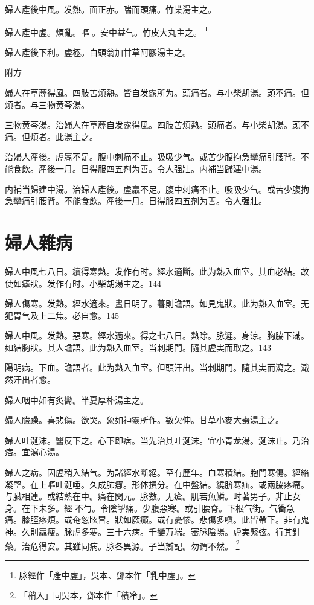 {\khaaitp 婦人}產後中風。发熱。面{\khaaitp 正}赤。喘而頭痛。竹枼湯主之。

婦人產中虗。煩亂。嘔{\sungtpii 𠱘}。安中益气。竹皮大丸主之。
	\footnote{脉經作「產中虗」，吳本、鄧本作「乳中虗」。}

{\khaaitp 婦人}產後下利。虗極。白頭翁加甘草阿膠湯主之。

附方

婦人在草蓐得風。四肢苦煩熱。皆自发露所为。頭痛者。与小柴胡湯。頭不痛。但煩者。与三物黄芩湯。{\wuben}

三物黄芩湯。治婦人在草蓐自发露得風。四肢苦煩熱。頭痛者。与小柴胡湯。頭不痛。但煩者。此湯主之。{\dengben}

治婦人產後。虗羸不足。腹中刺痛不止。吸吸少气。或苦少腹拘急攣痛引腰背。不能食飲。產後一月。日得服四五剂为善。令人强壯。内補当歸建中湯。{\wuben}

内補当歸建中湯。治婦人產後。虗羸不足。腹中刺痛不止。吸吸少气。或苦少腹拘急攣痛引腰背。不能食飲。產後一月。日得服四五剂为善。令人强壯。{\dengben}

\chapter{婦人雜病}

婦人中風七八日。續得寒熱。发作有时。經水適斷。此为熱入血室。其血必結。故使如瘧狀。发作有时。小柴胡湯主之。144

婦人傷寒。发熱。經水適來。晝日明了。暮則譫語。如見鬼狀。此为熱入血室。无犯胃气及上二焦。必自愈。145

婦人中風。发熱。惡寒。經水適來。得之七八日。熱除。脉遲。身涼。胸脇下滿。如結胸狀。其人譫語。此为熱入血室。当刺期門。隨其{\khaaitp 虗}実而取之。143

陽明病。下血。譫語者。此为熱入血室。但頭汗出。当刺期門。隨其実而瀉之。濈然汗出者愈。

婦人咽中如有炙臠。半夏厚朴湯主之。

婦人臓躁。喜悲傷。欲哭。象如神靈所作。數欠伸。甘草小麥大棗湯主之。

婦人吐涎沫。醫反下之。心下即痞。当先治其吐涎沫。宜小青龙湯。涎沫止。乃治痞。宜瀉心湯。

婦人之病。因虗稍入結气。为諸經水斷絕。至有歷年。血寒積結。胞門寒傷。經絡凝堅。在上嘔吐涎唾。久成肺癰。形体損分。在中盤結。繞脐寒疝。或兩脇疼痛。与臓相連。或結熱在中。痛在関元。脉數。无瘡。肌若魚鱗。时著男子。非止女身。在下未多。經{\sungtpii 𠊱}不勻。令陰掣痛。少腹惡寒。或引腰脊。下根气街。气衝急痛。膝脛疼煩。或奄忽眩冒。狀如厥癲。或有憂惨。悲傷多嗔。此皆帶下。非有鬼神。久則羸瘦。脉虗多寒。三十六病。千變万端。審脉陰陽。虗実緊弦。行其針藥。治危得安。其雖同病。脉各異源。子当辯記。勿谓不然。
	\footnote{「稍入」同吳本，鄧本作「積冷」。}

